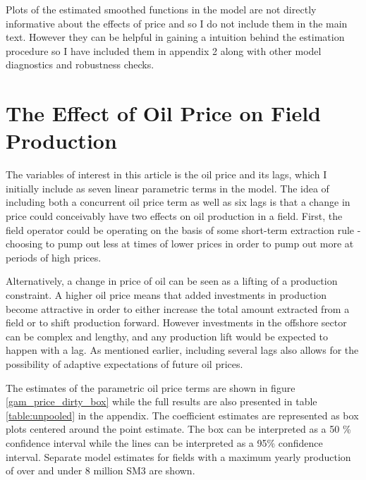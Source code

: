 \documentclass[12pt]{article}
\begin{document}
Plots of the estimated smoothed functions in the model are not directly informative about the effects of price and so I do not include them in the main text.  However they can be helpful in gaining a intuition behind the estimation procedure so I have included them in appendix 2 along with other model diagnostics and robustness checks.  

\section{The Effect of Oil Price on Field Production}

The variables of interest in this article is the oil price and its lags, which I initially include as seven linear parametric terms in the model.  The idea of including both a concurrent oil price term as well as six lags is that a change in price could conceivably have two effects on oil production in a field.  First, the field operator could be operating on the basis of some short-term extraction rule - choosing to pump out less at times of lower prices in order to pump out more at periods of high prices.  

Alternatively, a change in price of oil can be seen as a lifting of a production constraint.  A higher oil price means that added investments in production become attractive in order to either increase the total amount extracted from a field or to shift production forward.  However investments in the offshore sector can be complex and lengthy, and any production lift would be expected to happen with a lag.  As mentioned earlier, including several lags also allows for the possibility of adaptive expectations of future oil prices.

The estimates of the parametric oil price terms are shown in figure \ref{gam_price_dirty_box} while the full results are also presented in table \ref{table:unpooled} in the appendix.  The coefficient estimates are represented as box plots centered around the point estimate.  The box can be interpreted as a 50 \% confidence interval while the lines can be interpreted as a 95\% confidence interval.  Separate model estimates for fields with a maximum yearly production of over and under 8 million SM3 are shown.  
\end{document}
